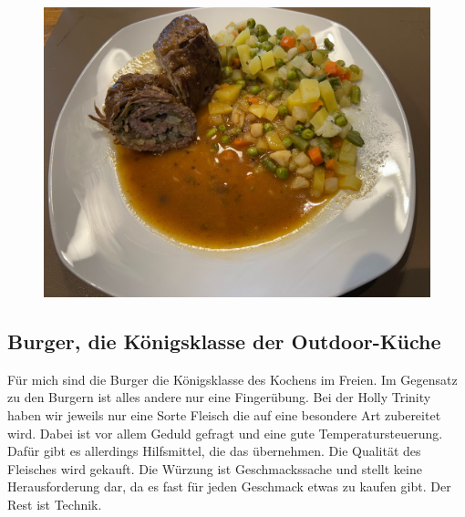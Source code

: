 \begin{figure}[htbp]
	\centering
	\begin{minipage}{1\textwidth}
		\centering
		\includegraphics[width=.9\linewidth]{pics/Rinderrouladen}
		\label{fig:Rinderrouladen}
	\end{minipage}
\end{figure}
\newpage

\subsection{Burger, die Königsklasse der Outdoor-Küche}
Für mich sind die Burger die Königsklasse des Kochens im Freien. Im Gegensatz zu den Burgern ist alles andere nur eine Fingerübung.
Bei der \glqq Holly Trinity \grqq {} haben wir jeweils nur eine Sorte Fleisch die auf eine besondere Art zubereitet wird. Dabei ist vor allem Geduld gefragt und eine gute Temperatursteuerung. Dafür gibt es allerdings Hilfsmittel, die das übernehmen.
Die Qualität des Fleisches wird gekauft. Die Würzung ist Geschmackssache und stellt keine  Herausforderung dar, da es fast  für jeden Geschmack etwas zu kaufen gibt. Der Rest ist Technik.

